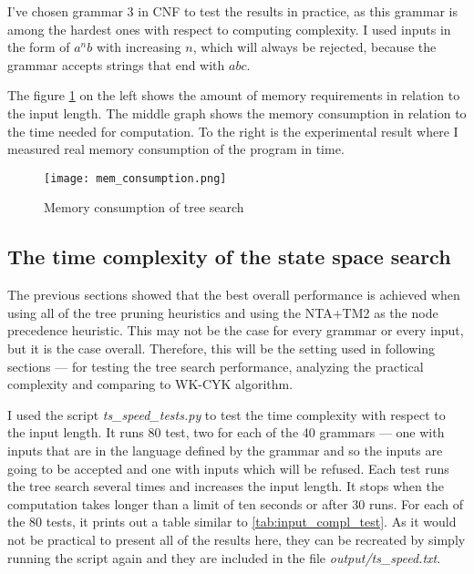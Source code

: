 I've chosen grammar 3 in CNF to test the results in practice, as this grammar is among the hardest ones with respect to computing complexity. I used inputs in the form of $a^nb$ with increasing $n$, which will always be rejected, because the grammar accepts strings that end with $abc$.

The figure \ref{fig:mem_consumption} on the left shows the amount of memory requirements in relation to the input length. The middle graph shows the memory consumption in relation to the time needed for computation. To the right is the experimental result where I measured real memory consumption of the program in time.

\begin{figure}[h!]
  \texttt{[image: mem\_consumption.png]}
  \caption{Memory consumption of tree search}
  \label{fig:mem_consumption}
\end{figure}


\subsection{The time complexity of the state space search}
The previous sections showed that the best overall performance is achieved when using all of the tree pruning heuristics and using the NTA+TM2 as the node precedence heuristic. This may not be the case for every grammar or every input, but it is the case overall. Therefore, this will be the setting used in following sections --- for testing the tree search performance, analyzing the practical complexity and comparing to WK-CYK algorithm.

I used the script \textit{ts\_speed\_tests.py} to test the time complexity with respect to the input length. It runs 80 test, two for each of the 40 grammars --- one with inputs that are in the language defined by the grammar and so the inputs are going to be accepted and one with inputs which will be refused. Each test runs the tree search several times and increases the input length. It stops when the computation takes longer than a limit of ten seconds or after 30 runs. For each of the 80 tests, it prints out a table similar to \ref{tab:input_compl_test}. As it would not be practical to present all of the results here, they can be recreated by simply running the script again and they are included in the file \textit{output/ts\_speed.txt}.

